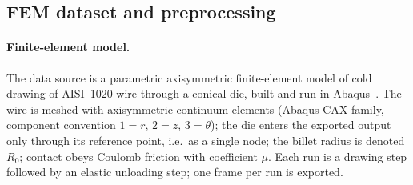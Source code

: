 \subsection{FEM dataset and preprocessing}\label{sec:fem-dataset}

\paragraph{Finite-element model.}
The data source is a parametric axisymmetric finite-element model of cold drawing of AISI~1020 wire through a conical die, built and run in Abaqus~\cite{TODO-abaqus-doc}. %
The wire is meshed with axisymmetric continuum elements (Abaqus CAX family, component convention $1=r$, $2=z$, $3=\theta$); %
the die enters the exported output only through its reference point, i.e.\ as a single node; %
the billet radius is denoted $R_0$; %
contact obeys Coulomb friction with coefficient $\mu$. %
Each run is a drawing step followed by an elastic unloading step; one frame per run is exported. %

